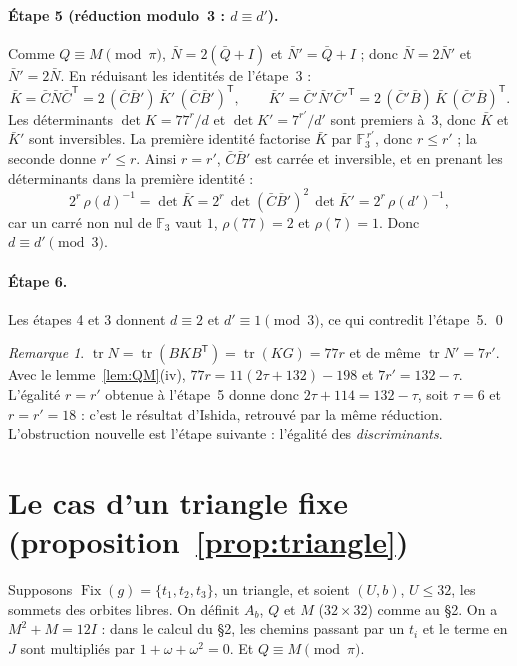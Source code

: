 \documentclass[11pt,a4paper]{article}
\theoremstyle{remark}
\newtheorem{remark}[theorem]{Remarque}
\newcommand{\F}{\mathbb{F}}
\newcommand{\Fix}{\operatorname{Fix}}
\newcommand{\tr}{\operatorname{tr}}
\begin{document}
\paragraph{Étape 5 (réduction modulo~3 : $d\equiv d'$).}
Comme $Q\equiv M\pmod\pi$, $\bar N=2(\bar Q+I)$ et $\bar N'=\bar Q+I$ ; donc $\bar N=2\bar N'$ et $\bar N'=2\bar N$. En réduisant les
identités de l'étape~3 :
\[
\bar K=\bar C\bar N\bar C^{\mathsf T}=2\,(\bar C\bar B')\,\bar K'\,(\bar C\bar B')^{\mathsf T},\qquad
\bar K'=\bar C'\bar N'\bar C'^{\mathsf T}=2\,(\bar C'\bar B)\,\bar K\,(\bar C'\bar B)^{\mathsf T}.
\]
Les déterminants $\det K=77^r/d$ et $\det K'=7^{r'}/d'$ sont premiers à~3, donc $\bar K$ et $\bar K'$ sont inversibles. La première
identité factorise $\bar K$ par $\F_3^{\,r'}$, donc $r\le r'$ ; la seconde donne $r'\le r$. Ainsi $r=r'$, $\bar C\bar B'$ est carrée
et inversible, et en prenant les déterminants dans la première identité :
\[
2^r\,\rho(d)^{-1}=\det\bar K=2^r\,\det(\bar C\bar B')^2\,\det\bar K'=2^r\,\rho(d')^{-1},
\]
car un carré non nul de $\F_3$ vaut $1$, $\rho(77)=2$ et $\rho(7)=1$. Donc $d\equiv d'\pmod 3$.

\paragraph{Étape 6.} Les étapes 4 et 3 donnent $d\equiv 2$ et $d'\equiv 1\pmod 3$, ce qui contredit l'étape~5. \qed

\begin{remark}\label{rem:tau}
$\tr N=\tr(BKB^{\mathsf T})=\tr(KG)=77r$ et de même $\tr N'=7r'$. Avec le lemme~\ref{lem:QM}(iv), $77r=11(2\tau+132)-198$ et
$7r'=132-\tau$. L'égalité $r=r'$ obtenue à l'étape~5 donne donc $2\tau+114=132-\tau$, soit $\tau=6$ et $r=r'=18$ : c'est le
résultat d'Ishida, retrouvé par la même réduction. L'obstruction nouvelle est l'étape suivante : l'égalité des
\emph{discriminants}.
\end{remark}

\section{Le cas d'un triangle fixe (proposition~\ref{prop:triangle})}

Supposons $\Fix(g)=\{t_1,t_2,t_3\}$, un triangle, et soient $(U,b)$, $U\le 32$, les sommets des orbites libres. On définit $A_b$, $Q$ et
$M$ ($32\times32$) comme au §2. On a $M^2+M=12I$ : dans le calcul du §2, les chemins passant par un $t_i$ et le terme en $J$ sont
multipliés par $1+\omega+\omega^2=0$. Et $Q\equiv M\pmod\pi$.
\end{document}
